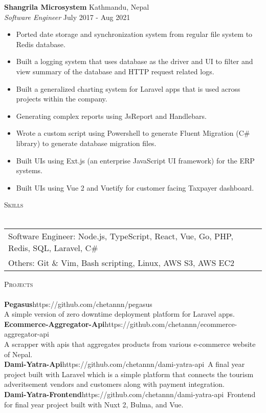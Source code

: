 \documentclass[a4paper]{article}
\newcommand{\lineunder} {
    \vspace*{-8pt} \\
    \hspace*{-18pt} \hrulefill \\
}
\newcommand{\header} [1] {
    {\hspace*{-18pt}\vspace*{6pt} \textsc{#1}}
    \vspace*{-6pt} \lineunder
}
\begin{document}
\textbf{Shangrila Microsystem} \hfill Kathmandu, Nepal\\
\textit{Software Engineer} \hfill July 2017 - Aug 2021\\
\vspace{-1mm}
\begin{itemize} \itemsep 1pt
	\item Ported date storage and synchronization system from regular file system to Redis database.
	\item Built a logging system that uses database as the driver and UI to filter and view summary of the database and HTTP request related logs.
	\item Built a generalized charting system for Laravel apps that is used across projects within the company.
	\item Generating complex reports using JsReport and Handlebars.
	\item Wrote a custom script using Powershell to generate Fluent Migration (C\# library) to generate database migration files.
	\item Built UIs using Ext.js (an enterprise JavaScript UI framework) for the ERP systems.
	\item Built UIs using Vue 2 and Vuetify for customer facing Taxpayer dashboard.
\end{itemize}


\header{Skills}
\begin{tabularx}{\textwidth}{ l X } 
	Software Engineer:  Node.js, TypeScript, React, Vue, Go, PHP, Redis, SQL, Laravel, C\#      \\
	Others:       Git \& Vim, Bash scripting, Linux, AWS S3, AWS EC2  \\
\end{tabularx}
\vspace{2mm}

\header{Projects}
{\textbf{Pegasus}}\hfill https://github.com/chetannn/pegasus\\
A simple version of zero downtime deployment platform for Laravel apps.\\
\vspace*{2mm}
{\textbf{Ecommerce-Aggregator-Api}}\hfill https://github.com/chetannn/ecommerce-aggregator-api\\
A scrapper with apis that aggregates products from various e-commerce website of Nepal.\\
\vspace*{2mm}
{\textbf{Dami-Yatra-Api}}\hfill https://github.com/chetannn/dami-yatra-api\
A final year project built with Laravel which is a simple platform that connects the tourism adveritsement vendors and customers along with payment integration.\\
\vspace*{2mm}
{\textbf{Dami-Yatra-Frontend}}\hfill https://github.com/chetannn/dami-yatra-api\
Frontend for final year project built with Nuxt 2, Bulma, and Vue.\\
\vspace*{2mm}
\ 
\end{document}
